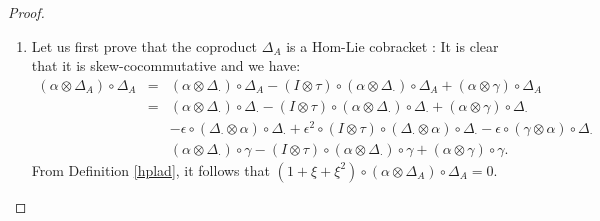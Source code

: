\documentclass{article}
\theoremstyle{definition}
\theoremstyle{remark}
\numberwithin{equation}{section}
\begin{document}
\begin{proof}
\begin{enumerate}
 \item Let us first
prove that the coproduct $\Delta_A$ is a Hom-Lie cobracket :
 It is clear that it is skew-cocommutative and we have:
\begin{eqnarray}
 (\alpha\otimes\Delta_A)\circ\Delta_A&=&(\alpha\otimes\Delta_\cdot)\circ\Delta_A-(I\otimes\tau)\circ(\alpha\otimes\Delta_\cdot)\circ\Delta_A+(\alpha\otimes\gamma)\circ\Delta_A\nonumber\\
&=&(\alpha\otimes\Delta_\cdot)\circ\Delta_\cdot-(I\otimes\tau)\circ(\alpha\otimes\Delta_\cdot)\circ\Delta_\cdot+(\alpha\otimes\gamma)\circ\Delta_\cdot\nonumber\\
&&-\epsilon\circ(\Delta_\cdot\otimes\alpha)\circ\Delta_\cdot+\epsilon^2\circ(I\otimes\tau)\circ(\Delta_\cdot\otimes\alpha)\circ\Delta_\cdot-\epsilon\circ(\gamma\otimes\alpha)\circ\Delta_\cdot\nonumber\\
&&(\alpha\otimes\Delta_\cdot)\circ\gamma-(I\otimes\tau)\circ(\alpha\otimes\Delta_\cdot)\circ\gamma+(\alpha\otimes\gamma)\circ\gamma.
\end{eqnarray}
From Definition \ref{hplad}, it follows that $(1+\xi+\xi^2)\circ(\alpha\otimes\Delta_A)\circ\Delta_A=0$.


\end{enumerate}
\end{proof}
\end{document}

